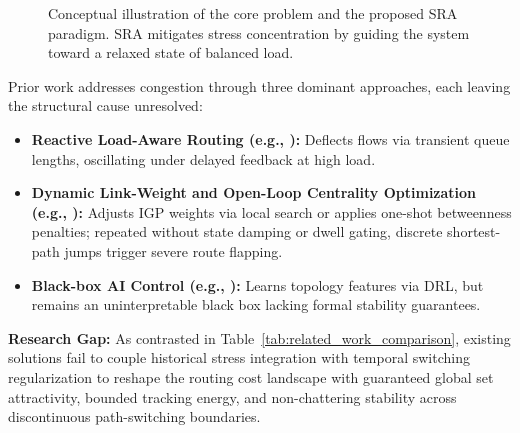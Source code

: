 \documentclass{ccjnl}
\newcommand{\rev}[1]{{\color{blue}#1}}
\def\rev#1{#1}%
\begin{document}
\begin{figure}[!t]
{\begin{minipage}{0.46\columnwidth}
    \end{minipage}
    }
    
    \caption{Conceptual illustration of the core problem and the proposed SRA paradigm. SRA mitigates stress concentration by guiding the system toward a relaxed state of balanced load.}
    \label{fig:intro_scenario}
\end{figure}

Prior work addresses congestion through \rev{three} dominant approaches, each leaving the structural cause unresolved:
\begin{itemize}
    \item \textbf{Reactive Load-Aware Routing (e.g., \cite{Macabale2020Cradle}):} Deflects flows via transient queue lengths, oscillating under delayed feedback at high load.
    \item \rev{\textbf{Dynamic Link-Weight and Open-Loop Centrality Optimization (e.g., \cite{Fortz2000OSPF,Upadhyay2024OpticalBC}):} Adjusts IGP weights via local search or applies one-shot betweenness penalties; repeated without state damping or dwell gating, discrete shortest-path jumps trigger severe route flapping.}
    \item \textbf{Black-box AI Control (e.g., \cite{Wei2023GRLPS}):} Learns topology features via DRL, but remains an uninterpretable black box lacking formal stability guarantees.
\end{itemize}

\rev{\textbf{Research Gap:} As contrasted in Table~\ref{tab:related_work_comparison}, existing solutions fail to couple historical stress integration with temporal switching regularization to reshape the routing cost landscape with guaranteed global set attractivity, bounded tracking energy, and non-chattering stability across discontinuous path-switching boundaries.}
\end{document}
